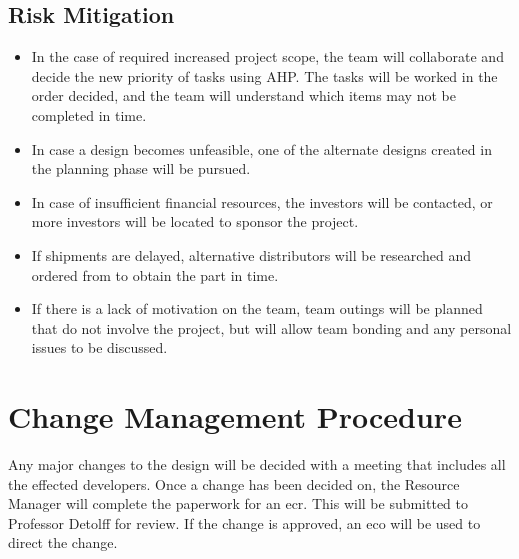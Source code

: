 \subsection{Risk Mitigation}
\begin{itemize}
	\item In the case of required increased project scope, the team will collaborate and decide the new priority of tasks using AHP. The tasks will be worked in the order decided, and the team will understand which items may not be completed in time.
	\item In case a design becomes unfeasible, one of the alternate designs created in the planning phase will be pursued.
	\item In case of insufficient financial resources, the investors will be contacted, or more investors will be located to sponsor the project.
	\item If shipments are delayed, alternative distributors will be researched and ordered from to obtain the part in time.
	\item If there is a lack of motivation on the team, team outings will be planned that do not involve the project, but will allow team bonding and any personal issues to be discussed.
\end{itemize}

\section{Change Management Procedure}
Any major changes to the design will be decided with a meeting that includes all the effected developers.
Once a change has been decided on, the Resource Manager will complete the paperwork for an \gls{ecr}.
This will be submitted to Professor Detolff for review.
If the change is approved, an \gls{eco} will be used to direct the change.

